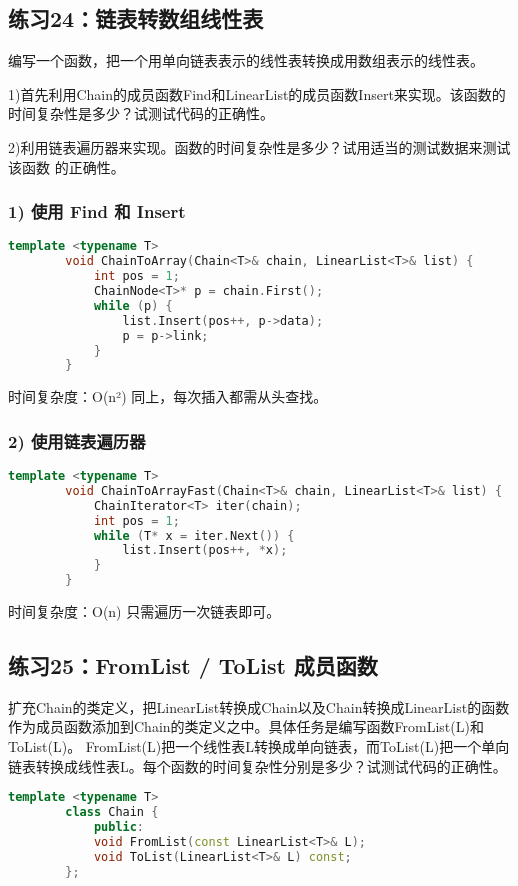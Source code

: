 \documentclass[UTF8]{ctexart}
\begin{document}
	
	
	\subsection*{练习24：链表转数组线性表}
	编写一个函数，把一个用单向链表表示的线性表转换成用数组表示的线性表。
	
	1)首先利用Chain的成员函数Find和LinearList的成员函数Insert来实现。该函数的时间复杂性是多少？试测试代码的正确性。
	
	2)利用链表遍历器来实现。函数的时间复杂性是多少？试用适当的测试数据来测试该函数
	的正确性。
	\subsubsection*{1) 使用 Find 和 Insert}
	
	\begin{lstlisting}[language=C++]
		template <typename T>
		void ChainToArray(Chain<T>& chain, LinearList<T>& list) {
			int pos = 1;
			ChainNode<T>* p = chain.First();
			while (p) {
				list.Insert(pos++, p->data);
				p = p->link;
			}
		}
	\end{lstlisting}
	
	 时间复杂度：O(n²)  
	同上，每次插入都需从头查找。
	
	\subsubsection*{2) 使用链表遍历器}
	
	\begin{lstlisting}[language=C++]
		template <typename T>
		void ChainToArrayFast(Chain<T>& chain, LinearList<T>& list) {
			ChainIterator<T> iter(chain);
			int pos = 1;
			while (T* x = iter.Next()) {
				list.Insert(pos++, *x);
			}
		}
	\end{lstlisting}
	
	 时间复杂度：O(n)  
	只需遍历一次链表即可。
	
	
	
	\subsection*{练习25：FromList / ToList 成员函数}
	扩充Chain的类定义，把LinearList转换成Chain以及Chain转换成LinearList的函数作为成员函数添加到Chain的类定义之中。具体任务是编写函数FromList(L)和ToList(L)。
	FromList(L)把一个线性表L转换成单向链表，而ToList(L)把一个单向链表转换成线性表L。每个函数的时间复杂性分别是多少？试测试代码的正确性。
	\begin{lstlisting}[language=C++]
		template <typename T>
		class Chain {
			public:
			void FromList(const LinearList<T>& L);
			void ToList(LinearList<T>& L) const;
		};
	\end{lstlisting}
	
\end{document}
